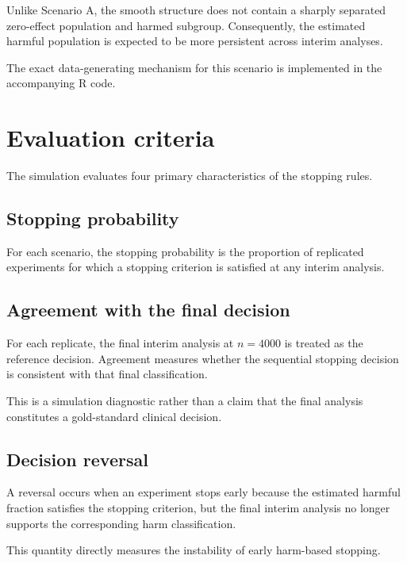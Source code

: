 \documentclass[11pt,a4paper]{article}
\begin{document}
Unlike Scenario A, the smooth structure does not contain a sharply separated
zero-effect population and harmed subgroup. Consequently, the estimated
harmful population is expected to be more persistent across interim analyses.

The exact data-generating mechanism for this scenario is implemented in the
accompanying R code.


\section{Evaluation criteria}

The simulation evaluates four primary characteristics of the stopping rules.

\subsection{Stopping probability}

For each scenario, the stopping probability is the proportion of replicated
experiments for which a stopping criterion is satisfied at any interim
analysis.

\subsection{Agreement with the final decision}

For each replicate, the final interim analysis at $n=4000$ is treated as the
reference decision. Agreement measures whether the sequential stopping
decision is consistent with that final classification.

This is a simulation diagnostic rather than a claim that the final analysis
constitutes a gold-standard clinical decision.

\subsection{Decision reversal}

A reversal occurs when an experiment stops early because the estimated
harmful fraction satisfies the stopping criterion, but the final interim
analysis no longer supports the corresponding harm classification.

This quantity directly measures the instability of early harm-based stopping.
\end{document}
